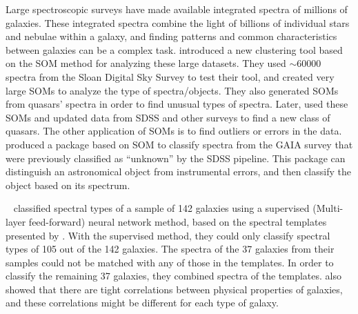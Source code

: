 Large spectroscopic surveys have made available integrated spectra of millions of galaxies.
These integrated spectra combine the light of billions of individual stars and nebulae within a galaxy, and
finding patterns and common characteristics between galaxies can be a complex task.
\citet{In12} introduced a new clustering tool based on the SOM method for analyzing these large datasets.
They used $\sim 60000$ spectra from the Sloan Digital Sky Survey \citep[SDSS;][]{Abazajian09} to test their tool, and created very large SOMs to analyze the type of spectra/objects.
They also generated SOMs from quasars' spectra in order to find unusual types of spectra. 
Later, \citet{Meusinger16} used these SOMs and updated data from SDSS and other surveys to find a new class of quasars.
The other application of SOMs is to find outliers or errors in the data.
\citet{Fustes13} produced a package based on SOM to classify spectra from the GAIA survey that were previously classified as ``unknown'' by the SDSS pipeline. This package can distinguish an astronomical object from instrumental errors, and then classify the object based on its spectrum.

~\citet[][hereafter ]{Hossein12} classified spectral types of a sample of 142 galaxies using a supervised (Multi-layer feed-forward) neural network method, based on the spectral templates presented by .
With the supervised method, they could only classify spectral types of 105 out of the 142 galaxies.
The spectra of the 37 galaxies from their samples could not be matched with any of those in the  templates. 
In order to classify the remaining 37 galaxies, they combined spectra of the  templates.
 also showed that there are tight correlations between physical properties of galaxies, and these correlations might be different for each type of galaxy.

